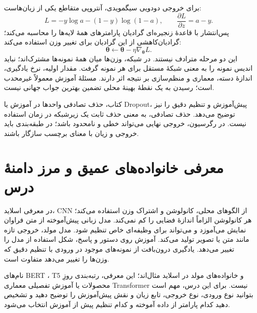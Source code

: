 برای خروجی دودویی سیگمویدی، آنتروپی متقاطع یکی از زیان‌هاست:
\[L=-y\log a-(1-y)\log(1-a),\qquad \frac{\partial L}{\partial z}=a-y.\]
پس‌انتشار با قاعدهٔ زنجیره‌ای گرادیان پارامترهای همهٔ لایه‌ها را محاسبه می‌کند؛ گرادیان‌کاهشی از این گرادیان برای تغییر وزن استفاده می‌کند:
\[\boldsymbol\theta\leftarrow\boldsymbol\theta-\eta\nabla_{\boldsymbol\theta}L.\]
این دو مرحله مترادف نیستند. در شبکه، وزن‌ها میان همهٔ نمونه‌ها مشترک‌اند؛ نباید اندیس نمونه را به معنی شبکهٔ مستقل برای هر نمونه گرفت. مقدار اولیه، نرخ یادگیری، اندازهٔ دسته، معماری و منظم‌سازی بر نتیجه اثر دارند. مسئلهٔ آموزش معمولاً غیرمحدب است؛ رسیدن به یک نقطهٔ بهینهٔ محلی تضمین بهترین جواب جهانی نیست.

کتاب، حذف تصادفی واحدها در آموزش یا Dropout، پیش‌آموزش و تنظیم دقیق را نیز توضیح می‌دهد. حذف تصادفی، به معنی حذف ثابت یک زیرشبکه در زمان استفاده نیست. در رگرسیون، خروجی نهایی می‌تواند خطی و نامحدود باشد؛ در طبقه‌بندی باید خروجی و زیان با معنای برچسب سازگار باشند.

\section{معرفی خانواده‌های عمیق و مرز دامنهٔ درس}
در معرفی اسلاید، CNN از الگوهای محلی، کانولوشن و اشتراک وزن استفاده می‌کند؛ هر کانولوشن الزاماً اندازهٔ فضایی را کم نمی‌کند. مدل زبانی پیش‌آموخته از متن فراوان نمایش می‌آموزد و می‌تواند برای وظیفه‌ای خاص تنظیم شود. مدل مولد، خروجی تازه مانند متن یا تصویر تولید می‌کند. آموزش روی دستور و پاسخ، شکل استفاده از مدل را تغییر می‌دهد. یادگیری درون‌بافت از نمونه‌های موجود در ورودی با تنظیم دقیق که وزن‌ها را تغییر می‌دهد متفاوت است.

نام‌های BERT ، T5 و خانواده‌های مولد در اسلاید مثال‌اند؛ این معرفی، رتبه‌بندی روزِ محصولات یا آموزش تفصیلی معماری Transformer نیست. برای این درس، مهم است بتوانید نوع ورودی، نوع خروجی، تابع زیان و نقش پیش‌آموزش را توضیح دهید و تشخیص دهید کدام پارامتر از داده آموخته و کدام تنظیم پیش از آموزش انتخاب می‌شود.
